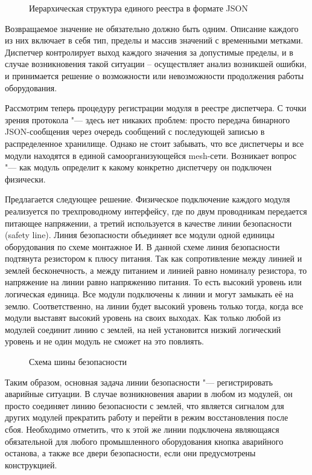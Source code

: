 \begin{figure}[ht]
\caption{Иерархическая структура единого реестра в формате JSON}\label{fig:json}
\end{figure}

Возвращаемое значение не обязательно должно быть одним. Описание каждого из них включает в себя тип, пределы и массив значений с временными метками. Диспетчер контролирует выход каждого значения за допустимые пределы, и в случае возникновения такой ситуации – осуществляет анализ возникшей ошибки, и принимается решение о возможности или невозможности продолжения работы оборудования.

Рассмотрим теперь процедуру регистрации модуля в реестре диспетчера. С точки зрения протокола "--- здесь нет никаких проблем: просто передача бинарного JSON-сообщения через очередь сообщений с последующей записью в распределенное хранилище. Однако не стоит забывать, что все диспетчеры и все модули находятся в единой самоорганизующейся mesh-сети. Возникает вопрос "--- как модуль определит к какому конкретно диспетчеру он подключен физически.

Предлагается следующее решение. Физическое подключение каждого модуля реализуется по трехпроводному интерфейсу, где по двум проводникам передается питающее напряжении, а третий используется в качестве линии безопасности (safety line). Линия безопасности объединяет все модули одной единицы оборудования по схеме монтажное И. В данной схеме линия безопасности подтянута резистором к плюсу питания. Так как сопротивление между линией и землей бесконечность, а между питанием и линией равно номиналу резистора, то напряжение на линии равно напряжению питания. То есть высокий уровень или логическая единица. Все модули подключены к линии и могут замыкать её на землю. Соответственно, на линии будет высокий уровень только тогда, когда все модули выставят высокий уровень на своих выходах. Как только любой из модулей соединит линию с землей, на ней установится низкий логический уровень и не один модуль не сможет на это повлиять.

\begin{figure}[ht]
\caption{Схема шины безопасности}\label{fig:logic-and}
\end{figure}

Таким образом, основная задача линии безопасности "--- регистрировать аварийные ситуации. В случае возникновения аварии в любом из модулей, он просто соединяет линию безопасности с землей, что является сигналом для других модулей прекратить работу и перейти в режим восстановления после сбоя. Необходимо отметить, что к этой же линии подключена являющаяся обязательной для любого промышленного оборудования кнопка аварийного останова, а также все двери безопасности, если они предусмотрены конструкцией.

